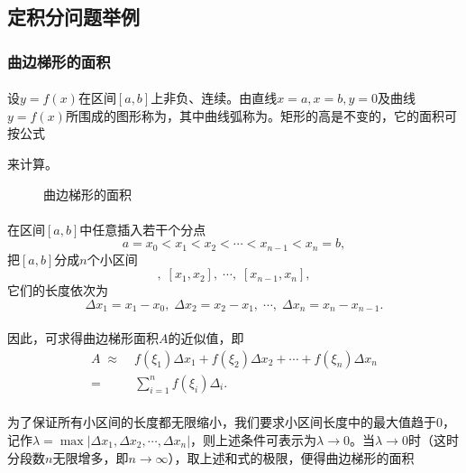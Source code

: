 \subsection{定积分问题举例}
\subsubsection{曲边梯形的面积}
\paragraph{}
设$y=f(x)$在区间$[a,b]$上非负、连续。由直线$x=a, x=b, y=0$及曲线$y=f(x)$所围成的图形称为，其中曲线弧称为。矩形的高是不变的，它的面积可按公式

\begin{center}
\end{center}
来计算。

\begin{figure}[H]
\centering
  
  \caption{曲边梯形的面积}
  \label{曲边梯形的面积}
\end{figure}

\paragraph{}
在区间$[a,b]$中任意插入若干个分点
\begin{equation*}
  a = x_0 < x_1 < x_2 < \cdots < x_{n-1} < x_n = b,
\end{equation*}
把$[a,b]$分成$n$个小区间
\begin{equation*}
  [x_0,x_1], \; [x_1,x_2], \; \cdots, \; [x_{n-1}, x_n],
\end{equation*}
它们的长度依次为
\begin{equation*}
  \Delta x_1 = x_1 - x_0, \; \Delta x_2 = x_2 - x_1, \; \cdots, \; \Delta x_n = x_n - x_{n-1}.
\end{equation*}

\paragraph{}
因此，可求得曲边梯形面积$A$的近似值，即
\begin{align*}
  A \;\approx&\; f(\xi_1)\Delta x_1 + f(\xi_2)\Delta x_2 + \cdots + f(\xi_n)\Delta x_n \\
  =&\; \sum_{i=1}^nf(\xi_i)\Delta_i.
\end{align*}

\paragraph{}
为了保证所有小区间的长度都无限缩小，我们要求小区间长度中的最大值趋于$0$，记作$\lambda = \max|\Delta x_1, \Delta x_2, \cdots, \Delta x_n|$，则上述条件可表示为$\lambda \to 0$。当$\lambda \to 0$时（这时分段数$n$无限增多，即$n\to\infty$），取上述和式的极限，便得曲边梯形的面积

